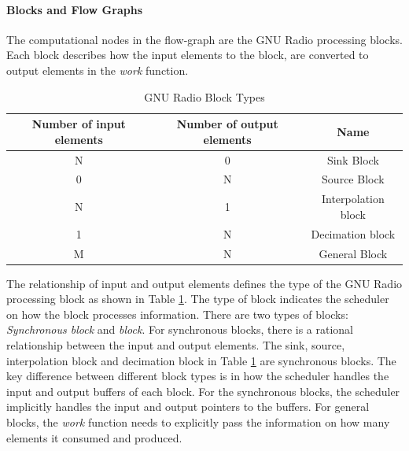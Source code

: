 \paragraph{Blocks and Flow Graphs}

The computational nodes in the flow-graph are the GNU Radio processing blocks.
Each block describes how the input elements to the block, are converted to output elements in the \textit{work} function.

\begin{table}[h!]
\centering
\begin{tabular}{|c|c|c|}
\hline
Number of input elements & Number of output elements & Name\\
\hline
N & 0 & Sink Block\\
0 & N & Source Block\\
N & 1 & Interpolation block\\
1 & N & Decimation block\\
M & N & General Block\\
\hline
\end{tabular}
\caption{GNU Radio Block Types}
\label{block_type}
\end{table} 

The relationship of input and output elements defines the type of the GNU Radio processing block as shown in Table \ref{block_type}.
The type of block indicates the scheduler on how the block processes information.
There are two types of blocks: \textit{Synchronous block} and \textit{block}.
For synchronous blocks, there is a rational relationship between the input and output elements.
The sink, source, interpolation block and decimation block in Table \ref{block_type} are synchronous blocks.
The key difference between different block types is in how the scheduler handles the input and output buffers of each block.
For the synchronous blocks, the scheduler implicitly handles the input and output pointers to the buffers.
For general blocks, the \textit{work} function needs to explicitly pass the information on how many elements it consumed and produced.\\

